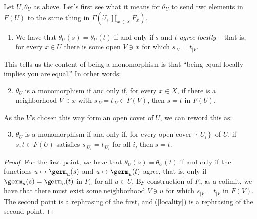 \documentclass[11pt]{amsart}
\begin{document}
\begin{lemma}
\label{lem:theta-monomorphism} 
Let $U,\theta_U$ as above. Let's first see what it means for $\theta_U$ to send two elements in $F(U)$ to the same thing in $\Gamma(U,\amalg_{x\in X}F_x)$.
\begin{enumerate}
    \item We have that $\theta_U(s) = \theta_U(t)$ if and only if $s$ and $t$ \emph{agree locally} -- that is, for every $x\in U$ there is some open $V\ni x$ for which $s_{|V} = t_{|V}$.
\end{enumerate}
This tells us the content of being a monomorphism is that ``being equal locally implies you are equal.'' In other words:
\begin{enumerate}
\setcounter{enumi}{1}
    \item $\theta_U$ is a monomorphism if and only if, for every $x\in X$, if there is a neighborhood $V\ni x$ with $s_{|V} = t_{|V}\in F(V)$, then $s=t$ in $F(U)$.
\end{enumerate}
As the $V$'s chosen this way form an open cover of $U$, we can reword this as:
\begin{enumerate}
\setcounter{enumi}{2}
    \item\label{locality} $\theta_U$ is a monomorphism if and only if, for every open cover $\left\{ U_i \right\}$ of $U$, if $s,t\in F(U)$ satisfies $s_{|U_i} = t_{|U_i}$ for all $i$, then $s=t$.
\end{enumerate}
\end{lemma}
\begin{proof} For the first point, we have that $\theta_U(s) = \theta_U(t)$ if and only if the functions $u \mapsto \germ_u(s)$ and $u \mapsto \germ_u(t)$ agree, that is, only if $\germ_u(s) = \germ_u(t)$ in $F_u$ for all $u\in U$. By construction of $F_u$ as a colimit, we have that there must exist some neighborhood $V\ni u$ for which $s_{|V} = t_{|V}$ in $F(V)$. The second point is a rephrasing of the first, and (\ref{locality}) is a rephrasing of the second point.
\end{proof}
\end{document}
